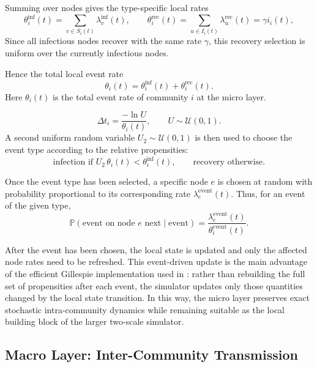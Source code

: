 \documentclass[a4paper,fleqn]{cas-sc}
\newcommand{\ReadStatusTwo}[5]{}
\begin{document}
Summing over nodes gives the type-specific local rates
\[
\theta_i^{\mathrm{inf}}(t)=\sum_{v\in S_i(t)} \lambda^{\mathrm{inf}}_v(t),
\qquad
\theta_i^{\mathrm{rec}}(t)=\sum_{u\in I_i(t)} \lambda^{\mathrm{rec}}_u(t)=\gamma i_i(t),
\]
Since all infectious nodes recover with the same rate \(\gamma\), this recovery selection is uniform over the currently infectious nodes. 

Hence the total local event rate
\[
\theta_i(t)=\theta_i^{\mathrm{inf}}(t)+\theta_i^{\mathrm{rec}}(t).
\]
Here \(\theta_i(t)\) is the total event rate of community \(i\) at the micro layer.

\[
\Delta t_i=\frac{-\ln U}{\theta_i(t)},
\qquad U\sim\mathcal U(0,1).
\]
A second uniform random variable \(U_2\sim\mathcal U(0,1)\) is then used to choose the event type according to the relative propensities:
\[
\text{infection if } U_2\,\theta_i(t) < \theta_i^{\mathrm{inf}}(t),
\qquad
\text{recovery otherwise.}
\]

Once the event type has been selected, a specific node $e$ is chosen at random with probability proportional to its corresponding rate \(\lambda^{\mathrm{event}}_e(t)\). Thus, for an event of the given type,
\[
\mathbb P(\text{event on node } e \text{ next}\mid \mathrm{event})=
\frac{\lambda^{\mathrm{event}}_e(t)}{\theta_i^{\mathrm{event}}(t)}.
\]

After the event has been chosen, the local state is updated and only the affected node rates need to be refreshed. This event-driven update is the main advantage of the efficient Gillespie implementation used in \cite{kuryliak2025simulating}: rather than rebuilding the full set of propensities after each event, the simulator updates only those quantities changed by the local state transition. In this way, the micro layer preserves exact stochastic intra-community dynamics while remaining suitable as the local building block of the larger two-scale simulator.


\subsection{Macro Layer: Inter-Community Transmission}
\ReadStatusTwo{Macro Layer: Inter-Community Transmission}{Yulian}{0}{Michael}{0}
\end{document}
